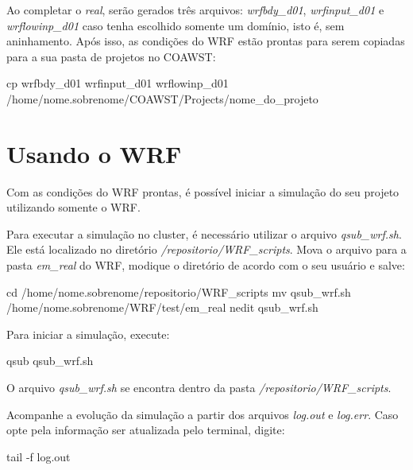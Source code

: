 \noindent Ao completar o \textit{real}, serão gerados três arquivos: \textit{wrfbdy\_d01}, \textit{wrfinput\_d01} e \textit{wrflowinp\_d01} caso tenha escolhido somente um domínio, isto é, sem aninhamento. Após isso, as condições do WRF estão prontas para serem copiadas para a sua pasta de projetos no COAWST:
\bigskip

\begin{bashcode}[fontsize=\scriptsize]
cp wrfbdy_d01 wrfinput_d01 wrflowinp_d01 /home/nome.sobrenome/COAWST/Projects/nome_do_projeto
\end{bashcode}
\bigskip

\section{Usando o WRF}
\bigskip

\noindent Com as condições do WRF prontas, é possível iniciar a simulação do seu projeto utilizando somente o WRF.
\bigskip

\noindent Para executar a simulação no cluster, é necessário utilizar o arquivo \textit{qsub\_wrf.sh}. Ele está localizado no diretório \textit{/repositorio/WRF\_scripts}. Mova o arquivo para a pasta \textit{em\_real} do WRF, modique o diretório de acordo com o seu usuário e salve:
\bigskip

\begin{bashcode}
cd /home/nome.sobrenome/repositorio/WRF_scripts
mv qsub_wrf.sh /home/nome.sobrenome/WRF/test/em_real
nedit qsub_wrf.sh
\end{bashcode}
\bigskip

\noindent Para iniciar a simulação, execute:
\bigskip

\begin{bashcode}
qsub qsub_wrf.sh
\end{bashcode}
\bigskip

\begin{tcolorbox}[enhanced,
  grow to left by=0cm,%
  grow to right by=0cm,%
  enlarge top by=0cm,%
  enlarge bottom by=0cm,%
  tcbox raise base,
  boxrule=1.0pt,
  left=18mm,
  colframe=red!50!black,coltext=red!25!black,colback=red!10!white,
  overlay={\begin{tcbclipinterior}\fill[red!75!blue!50!white] (frame.south west)
    rectangle node[text=white,font=\sffamily\bfseries\footnotesize,rotate=0] {ATENÇÃO} ([xshift=18mm]frame.north west);\end{tcbclipinterior}}]
O arquivo \textit{qsub\_wrf.sh} se encontra dentro da pasta \textit{/repositorio/WRF\_scripts}.
\end{tcolorbox}
\bigskip

\noindent Acompanhe a evolução da simulação a partir dos arquivos \textit{log.out} e \textit{log.err}. Caso opte pela informação ser atualizada pelo terminal, digite:
\bigskip

\begin{bashcode}
tail -f log.out
\end{bashcode}
\bigskip
